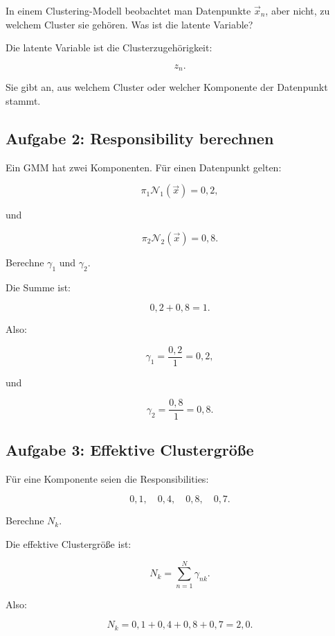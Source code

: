 In einem Clustering-Modell beobachtet man Datenpunkte \(\vec{x}_n\), aber nicht, zu welchem Cluster sie gehören.
Was ist die latente Variable?

\begin{examplebox}
Die latente Variable ist die Clusterzugehörigkeit:

\[
    z_n.
\]

Sie gibt an, aus welchem Cluster oder welcher Komponente der Datenpunkt stammt.
\end{examplebox}

\subsection{Aufgabe 2: Responsibility berechnen}

Ein GMM hat zwei Komponenten.
Für einen Datenpunkt gelten:

\[
    \pi_1\mathcal{N}_1(\vec{x})=0{,}2,
\]

und

\[
    \pi_2\mathcal{N}_2(\vec{x})=0{,}8.
\]

Berechne \(\gamma_{1}\) und \(\gamma_{2}\).

\begin{examplebox}
Die Summe ist:

\[
    0{,}2+0{,}8=1.
\]

Also:

\[
    \gamma_1
    =
    \frac{0{,}2}{1}
    =
    0{,}2,
\]

und

\[
    \gamma_2
    =
    \frac{0{,}8}{1}
    =
    0{,}8.
\]
\end{examplebox}

\subsection{Aufgabe 3: Effektive Clustergröße}

Für eine Komponente seien die Responsibilities:

\[
    0{,}1,
    \quad
    0{,}4,
    \quad
    0{,}8,
    \quad
    0{,}7.
\]

Berechne \(N_k\).

\begin{examplebox}
Die effektive Clustergröße ist:

\[
    N_k
    =
    \sum_{n=1}^{N}
    \gamma_{nk}.
\]

Also:

\[
    N_k
    =
    0{,}1+0{,}4+0{,}8+0{,}7
    =
    2{,}0.
\]
\end{examplebox}

